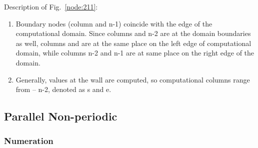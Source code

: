 Description of Fig.~\ref{node:211}:
\begin{enumerate}
  \item Boundary nodes (column {} and {\sf n-1}) coincide with the edge of 
        the computational domain. Since columns {} and {\sf n-2} are at the
        domain boundaries as well, columns {} and {} are at the same place 
        on the left edge of computational domain, while columns {\sf n-2} and 
        {\sf n-1} are at same place on the right edge of the domain.
  \item Generally, values at the wall are computed, so computational columns
        range from {} -- {\sf n-2}, denoted as {\sf s} and {\sf e}.
\end{enumerate}

\clearpage
\subsection{Parallel Non-periodic}

\subsubsection{Numeration}

